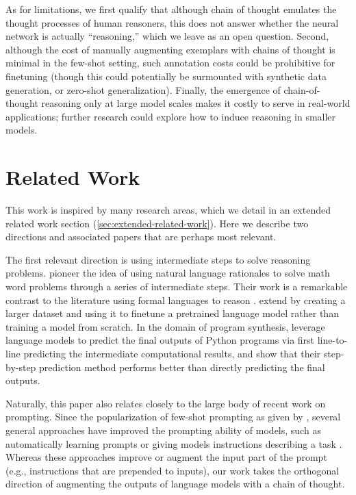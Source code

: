 As for limitations, we first qualify that although chain of thought emulates the thought processes of human reasoners, this does not answer whether the neural network is actually ``reasoning,'' which we leave as an open question. Second, although the cost of manually augmenting exemplars with chains of thought is minimal in the few-shot setting, such annotation costs could be prohibitive for finetuning (though this could potentially be surmounted with synthetic data generation, or zero-shot generalization).
 Finally, the emergence of chain-of-thought reasoning only at large model scales makes it costly to serve in real-world applications; further research could explore how to induce reasoning in smaller models.

\section{Related Work} This work is inspired by many research areas, which we detail in an extended related work section (\cref{sec:extended-related-work}). Here we describe two directions and associated papers that are perhaps most relevant.

The first relevant direction is using intermediate steps to solve reasoning problems. \cite{ling-etal-2017-program} pioneer the idea of using natural language rationales to solve math word problems through a series of intermediate steps. Their work is a remarkable contrast to the literature using formal languages to reason \citep{roy-2016-reasoning, chiang-chen-2019-semantically, amini-etal-2019-mathqa, chen2019neural}.  \citet{cobbe2021training} extend \citet{ling-etal-2017-program} by creating a larger dataset and using it to finetune a pretrained language model rather than training a model from scratch. In the domain of program synthesis, \cite{nye2021show} leverage language models to predict the final outputs of Python programs via first line-to-line predicting the intermediate computational results, and show that their step-by-step prediction method performs better than directly predicting the final outputs.  

Naturally, this paper also relates closely to the large body of recent work on prompting. Since the popularization of few-shot prompting as given by \citet{brown2020language}, several general approaches have improved the prompting ability of models, such as automatically learning prompts \citep{lester-etal-2021-power} or giving models instructions describing a task \citep{wei2021finetuned,sanh2021multitask,ouyang2022training}. Whereas these approaches improve or augment the input part of the prompt (e.g., instructions that are prepended to inputs), our work takes the orthogonal direction of augmenting the outputs of language models with a chain of thought.

